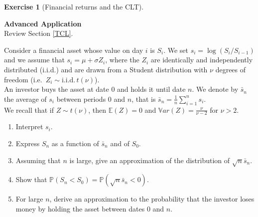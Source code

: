 \documentclass[
  11pt,
]{book}
\theoremstyle{definition}
\theoremstyle{definition}
\theoremstyle{definition}
\newtheorem{exercise}{Exercise}[chapter]
\theoremstyle{definition}
\theoremstyle{remark}
\begin{document}
\begin{exercisebox}

\begin{exercise}[Financial returns and the CLT]
\protect\hypertarget{exr:clt-financial-returns}{}\label{exr:clt-financial-returns}

\textbf{Advanced \textbar{} Application}\\
Review Section \ref{TCL}.

Consider a financial asset whose value on day \(i\) is \(S_i\). We set \(s_i = \log(S_i/S_{i-1})\) and we assume that \(s_i = \mu + \sigma Z_i\), where the \(Z_i\) are identically and independently distributed (i.i.d.) and are drawn from a Student distribution with \(\nu\) degrees of freedom (i.e.~\(Z_i \sim \text{i.i.d.}\, t(\nu)\)).\\
An investor buys the asset at date \(0\) and holds it until date \(n\). We denote by \(\bar{s}_n\) the average of \(s_i\) between periods \(0\) and \(n\), that is \(\bar{s}_n = \frac{1}{n} \sum_{i=1}^n s_i\).\\
We recall that if \(Z \sim t(\nu)\), then \(\mathbb{E}(Z) = 0\) and \(\mathbb{V}ar(Z) = \frac{\nu}{\nu - 2}\) for \(\nu > 2\).

\begin{enumerate}
\def\labelenumi{\arabic{enumi}.}
\item
  Interpret \(s_i\).
\item
  Express \(S_n\) as a function of \(\bar{s}_n\) and of \(S_0\).
\item
  Assuming that \(n\) is large, give an approximation of the distribution of \(\sqrt{n}\bar{s}_n\).
\item
  Show that \(\mathbb{P}(S_n < S_0) = \mathbb{P}(\sqrt{n}\bar{s}_n < 0)\).
\item
  For large \(n\), derive an approximation to the probability that the investor loses money by holding the asset between dates 0 and \(n\).
\end{enumerate}

\end{exercise}

\end{exercisebox}

\end{document}
